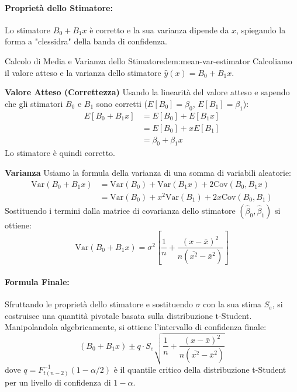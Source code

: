 \paragraph{Proprietà dello Stimatore:} Lo stimatore \(B_0 + B_1x\) è corretto
e la sua varianza dipende da \(x\), spiegando la forma a "clessidra" della banda
di confidenza.

\begin{dimostrazione}{Calcolo di Media e Varianza dello
		Stimatore}{dem:mean-var-estimator}
	Calcoliamo il valore atteso e la varianza dello stimatore \(\hat{y}(x) = B_0
	+ B_1x\).

	\textbf{Valore Atteso (Correttezza)}
	Usando la linearità del valore atteso e sapendo che gli stimatori \(B_0\) e
	\(B_1\) sono corretti (\(E[B_0]=\beta_0\), \(E[B_1]=\beta_1\)):
	\begin{align*}
		E[B_0 + B_1x] & = E[B_0] + E[B_1x]   \\
		              & = E[B_0] + xE[B_1]   \\
		              & = \beta_0 + \beta_1x
	\end{align*}
	Lo stimatore è quindi corretto.

	\textbf{Varianza}
	Usiamo la formula della varianza di una somma di variabili aleatorie:
	\begin{align*}
		\text{Var}(B_0 + B_1x) & = \text{Var}(B_0) + \text{Var}(B_1x) +
		2\text{Cov}(B_0, B_1x)                                            \\
		                       & = \text{Var}(B_0) + x^2\text{Var}(B_1) +
		2x\text{Cov}(B_0, B_1)
	\end{align*}
	Sostituendo i termini dalla matrice di covarianza dello stimatore
	\((\hat{\beta}_0, \hat{\beta}_1)\) si ottiene:
	\[
		\text{Var}(B_0 + B_1 x) = \sigma^2 \left[ \frac{1}{n} + \frac{(x -
				\bar{x})^2}{n(\overline{x^2}-\bar{x}^2)} \right]
	\]
\end{dimostrazione}

\paragraph{Formula Finale:} Sfruttando le proprietà dello stimatore e
sostituendo \(\sigma\) con la sua stima \(S_e\), si costruisce una quantità
pivotale basata sulla distribuzione t-Student. Manipolandola algebricamente, si
ottiene l'intervallo di confidenza finale:
\[
	(B_0 + B_1 x) \pm q \cdot S_e \sqrt{\frac{1}{n} + \frac{(x -
			\bar{x})^2}{n(\overline{x^2}-\bar{x}^2)}}
\]
dove \(q = F_{t(n-2)}^{-1}(1 - \alpha/2)\) è il quantile critico della
distribuzione t-Student per un livello di confidenza di \(1-\alpha\).

